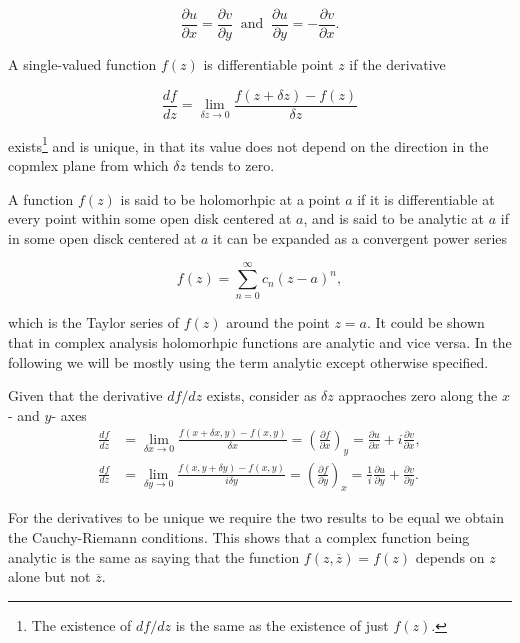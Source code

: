 \documentclass[english,a4paper,12pt]{report}
\begin{document}
\begin{equation}
    \frac{\partial u}{\partial x} = \frac{\partial v}{\partial y} ~\text { and }~ \frac{\partial u}{\partial y} = -\frac{\partial v}{\partial x}.
\end{equation}

A single-valued function \(f(z)\) is differentiable point \(z\) if the derivative 

\begin{equation}
    \frac{df}{dz} = \lim_{\delta z \to 0} \frac{f(z+\delta z)-f(z)}{\delta z}   
\end{equation}

exists\footnote{The existence of \(df/dz\) is the same as the existence of just \(f(z)\).} and is unique, in that its value does not depend on the direction in the copmlex plane from which \(\delta z\) tends to zero. 

A function \(f(z)\) is said to be holomorhpic at a point \(a\) if it is differentiable at every point within some open disk centered at \(a\), and is said to be analytic at \(a\) if in some open disck centered at \(a\) it can be expanded as a convergent power series 

\begin{equation}
    f(z) = \sum_{n=0}^{\infty} c_{n} (z-a)^{n},   
\end{equation}

which is the Taylor series of \(f(z)\) around the point \(z = a\). It could be shown that in complex analysis holomorhpic functions are analytic and vice versa. In the following we will be mostly using the term analytic except otherwise specified.

Given that the derivative \(df /dz\) exists, consider as \(\delta z\) appraoches zero along the \(x\)- and \(y\)- axes  
\begin{equation}
    \begin{aligned}
        \frac{df}{dz} &= \lim_{\delta x \to 0}  \frac{f(x+\delta x,y)-f(x,y)}{\delta x} = \left( \frac{\partial f}{\partial x} \right)_{y} = \frac{\partial u}{\partial x} + i\frac{\partial v}{\partial x} ,\\
        \frac{df}{dz} &= \lim_{\delta y \to 0}   \frac{f(x,y+\delta y)-f(x,y)}{i \delta y} = \left( \frac{\partial f}{\partial y} \right)_{x} = \frac{1}{i} \frac{\partial u}{\partial y} + \frac{\partial v}{\partial y}.
    \end{aligned}
\end{equation}

For the derivatives to be unique we require the two results to be equal we obtain the Cauchy-Riemann conditions. This shows that a complex function being analytic is the same as saying that the function \(f(z,\overline{z} ) = f(z)\) depends on \(z\) alone but not \(\overline{z} \). 
\end{document}
